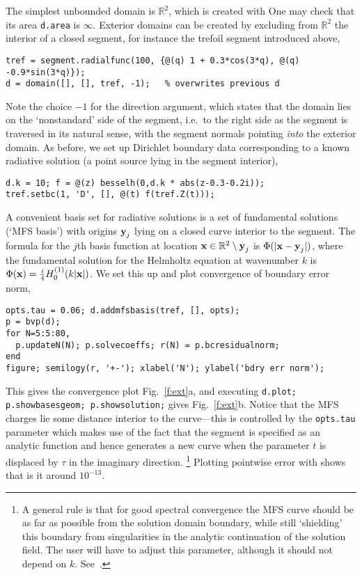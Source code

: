 The simplest unbounded domain is $\mathbb{R}^2$, which is created with
One may check that its area {\tt d.area} is $\infty$.
Exterior domains can be created by excluding from $\mathbb{R}^2$
the interior of
a closed segment, for instance the trefoil segment introduced above,
\begin{verbatim}
tref = segment.radialfunc(100, {@(q) 1 + 0.3*cos(3*q), @(q) -0.9*sin(3*q)});
d = domain([], [], tref, -1);   % overwrites previous d
\end{verbatim}
Note the choice $-1$ for the direction argument, which states that
the domain lies on the `nonstandard' side of the segment, i.e.\
to the right side as the segment is traversed in its natural sense,
with the segment normals pointing {\em into} the exterior domain.
As before, we set up Dirichlet boundary data corresponding to a known
radiative solution (a point source lying in the segment interior),
\begin{verbatim}
d.k = 10; f = @(z) besselh(0,d.k * abs(z-0.3-0.2i));
tref.setbc(1, 'D', [], @(t) f(tref.Z(t))); 
\end{verbatim}
A convenient basis set for radiative solutions is a set of fundamental
solutions (`MFS basis') with origins $\textbf{y}_j$
lying on a closed curve interior to the segment.
The formula for the $j$th basis function at location
$\textbf{x}\in\mathbb{R}^2\setminus \textbf{y}_j$
is $\Phi(|\textbf{x}-\textbf{y}_j|)$, where
the fundamental solution for the Helmholtz equation at wavenumber $k$ is
$\Phi(\textbf{x}) = \frac{i}{4}H_0^{(1)} (k|\textbf{x}|)$.
We set this up and plot convergence of boundary error norm,
\begin{verbatim}
opts.tau = 0.06; d.addmfsbasis(tref, [], opts);
p = bvp(d);
for N=5:5:80,
  p.updateN(N); p.solvecoeffs; r(N) = p.bcresidualnorm;
end
figure; semilogy(r, '+-'); xlabel('N'); ylabel('bdry err norm');
\end{verbatim}
This gives the convergence plot Fig.~\ref{f:ext}a, and
executing {\tt d.plot; p.showbasesgeom; p.showsolution;} gives
Fig.~\ref{f:ext}b. Notice that the MFS charges lie some distance interior
to the curve---this is controlled by the {\tt opts.tau} parameter which
makes use of the fact that the segment is specified as an analytic function
and hence generates a new curve when the parameter $t$ is displaced
by $\tau$ in the imaginary direction.%
  \footnote{A general rule is that for good spectral convergence
    the MFS curve should be
    as far as possible from the solution domain boundary, while still
    `shielding' this boundary from singularities in the analytic continuation
    of the solution field. The user will have to adjust this parameter,
    although it should not depend on $k$. See~\cite{mfs}.}
Plotting pointwise error with
shows that is it around $10^{-13}$.


